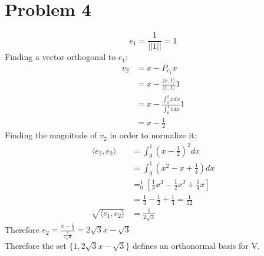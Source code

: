 \documentclass[fleqn]{article}
\begin{document}
\section*{Problem 4}
\begin{equation*}
    e_1=\frac{1}{||1||}=1
\end{equation*}
Finding a vector orthogonal to $e_1$:
\begin{equation*}
\begin{aligned}
    v_2&=x-P_{e_1}x\\
    &=x-\frac{\langle x, 1\rangle}{\langle 1,1\rangle}1\\
    &=x-\frac{\int_0^1 x dx}{\int_0^1 1dx}1\\
    &=x-\frac{1}{2}
\end{aligned}
\end{equation*}
Finding the magnitude of $v_2$ in order to normalize it:
\begin{equation*}
\begin{split}
    \langle e_2,e_2 \rangle &= \int_0^1 (x-\frac{1}{2})^2dx\\
    &= \int_0^1 (x^2-x+\frac{1}{4})dx\\
    &= _0^1[\frac{1}{3}x^3-\frac{1}{2}x^2+\frac{1}{4}x]\\
    &=\frac{1}{3}-\frac{1}{2}+\frac{1}{4}=\frac{1}{12}\\
    \sqrt{\langle e_1,e_2 \rangle} &= \frac{1}{2\sqrt{3}}
\end{split}
\end{equation*}
Therefore $e_2=\frac{x-\frac{1}{2}}{\frac{1}{2\sqrt{3}}}=2\sqrt{3}x-\sqrt{3}$\\
Therefore the set $\{1, 2\sqrt{3}x-\sqrt{3}\}$ defines an orthonormal basis for V.
\end{document}
